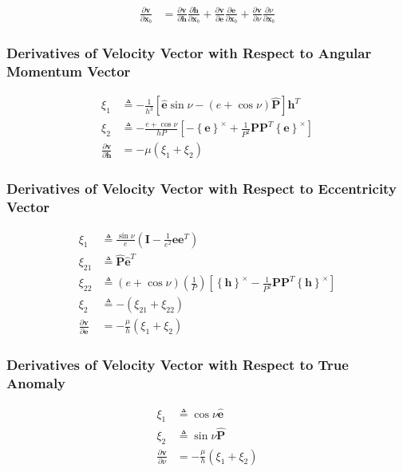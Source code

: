 \documentclass[]{article}
\newcommand{\vb}[1]{\bm{#1}} %
\newcommand{\vbh}[1]{\hat{\bm{#1}}} %
\newcommand{\pd}[2]{\frac{\partial #1}{\partial #2}} %
\newcommand{\crossmat}[1]{\left\{ {#1} \right\}^{\times}} %
\newcommand{\xb}[0]{\vb{x}_b}
\begin{document}
\begin{align}
\pd{\vb{v}}{\xb} &= \pd{\vb{v}}{\vb{h}} \pd{\vb{h}}{\xb} + \pd{\vb{v}}{\vb{e}} \pd{\vb{e}}{\xb} + \pd{\vb{v}}{\nu} \pd{\nu}{\xb}
\end{align}

\subsubsection{Derivatives of Velocity Vector with Respect to Angular Momentum Vector}

\begin{align}
\xi_1 &\triangleq -\frac{1}{h^3} \left[ \vbh{e} \sin{\nu} - \left( e + \cos{\nu} \right) \vbh{P} \right] \vb{h}^T \\
\xi_2 &\triangleq -\frac{e + \cos{\nu}}{h P} \left[ -\crossmat{\vb{e}} + \frac{1}{P^2} \vb{P} \vb{P}^T \crossmat{\vb{e}} \right] \\
\pd{\vb{v}}{\vb{h}} &= -\mu \left( \xi_1 + \xi_2 \right)
\end{align}

\subsubsection{Derivatives of Velocity Vector with Respect to Eccentricity Vector}

\begin{align}
\xi_1 &\triangleq \frac{\sin{\nu}}{e} \left( \vb{I} - \frac{1}{e^2} \vb{e} \vb{e}^T \right) \\
\xi_{21} &\triangleq \vbh{P}\vbh{e}^T \\
\xi_{22} &\triangleq \left( e + \cos{\nu} \right) \left( \frac{1}{P} \right) \left[ \crossmat{\vb{h}} - \frac{1}{P^2} \vb{P} \vb{P}^T \crossmat{\vb{h}} \right]  \\
\xi_2 &\triangleq -\left( \xi_{21} + \xi_{22} \right) \\
\pd{\vb{v}}{\vb{e}} &= -\frac{\mu}{h} \left( \xi_1 + \xi_2 \right)
\end{align}

\subsubsection{Derivatives of Velocity Vector with Respect to True Anomaly}

\begin{align}
\xi_1 &\triangleq \cos{\nu} \vbh{e} \\
\xi_2 &\triangleq \sin{\nu} \vbh{P} \\
\pd{\vb{v}}{\nu} &= -\frac{\mu}{h} \left( \xi_1 + \xi_2 \right)
\end{align}
\end{document}
